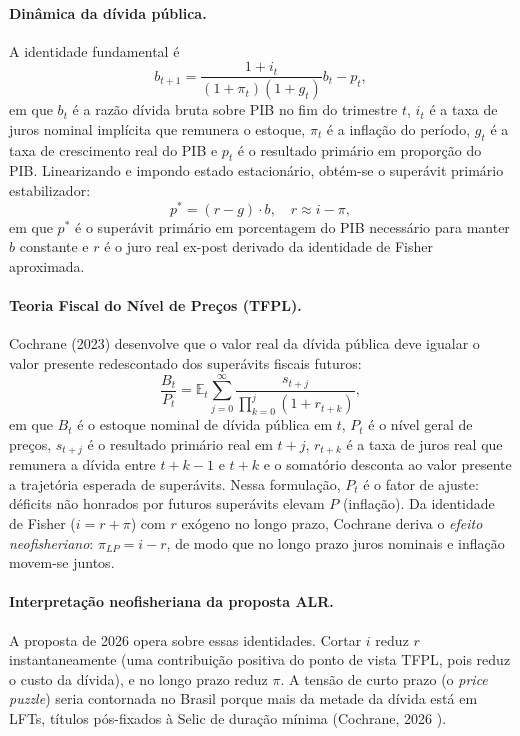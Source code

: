 \documentclass[11pt,a4paper]{article}
\begin{document}
\paragraph{Dinâmica da dívida pública.} A identidade fundamental é
\begin{equation}\label{eq:divida}
b_{t+1} = \frac{1 + i_t}{(1 + \pi_t)(1 + g_t)} b_t - p_t,
\end{equation}
em que $b_t$ é a razão dívida bruta sobre PIB no fim do trimestre $t$,
$i_t$ é a taxa de juros nominal implícita que remunera o estoque,
$\pi_t$ é a inflação do período, $g_t$ é a taxa de crescimento real do
PIB e $p_t$ é o resultado primário em proporção do PIB. Linearizando e
impondo estado estacionário, obtém-se o superávit primário
estabilizador:
\begin{equation}\label{eq:pestab}
p^* = (r - g) \cdot b, \quad r \approx i - \pi,
\end{equation}
em que $p^*$ é o superávit primário em porcentagem do PIB necessário
para manter $b$ constante e $r$ é o juro real ex-post derivado da
identidade de Fisher aproximada.

\paragraph{Teoria Fiscal do Nível de Preços (TFPL).} Cochrane (2023)
\cite{cochrane2023} desenvolve que o valor real da dívida pública deve
igualar o valor presente redescontado dos superávits fiscais futuros:
\begin{equation}\label{eq:tfpl}
\frac{B_t}{P_t} = \mathbb{E}_t \sum_{j=0}^{\infty} \frac{s_{t+j}}{\prod_{k=0}^{j} (1+r_{t+k})},
\end{equation}
em que $B_t$ é o estoque nominal de dívida pública em $t$, $P_t$ é o
nível geral de preços, $s_{t+j}$ é o resultado primário real em $t+j$,
$r_{t+k}$ é a taxa de juros real que remunera a dívida entre $t+k-1$ e
$t+k$ e o somatório desconta ao valor presente a trajetória esperada de
superávits. Nessa formulação, $P_t$ é o fator de ajuste: déficits não
honrados por futuros superávits elevam $P$ (inflação). Da identidade de
Fisher ($i = r + \pi$) com $r$ exógeno no longo prazo, Cochrane deriva o
\emph{efeito neofisheriano}: $\pi_{LP} = i - r$, de modo que no longo
prazo juros nominais e inflação movem-se juntos.

\paragraph{Interpretação neofisheriana da proposta ALR.} A proposta de
2026 opera sobre essas identidades. Cortar $i$ reduz $r$ instantaneamente
(uma contribuição positiva do ponto de vista TFPL, pois reduz o custo da
dívida), e no longo prazo reduz $\pi$. A tensão de curto prazo (o
\emph{price puzzle}) seria contornada no Brasil porque mais da metade da
dívida está em LFTs, títulos pós-fixados à Selic de duração mínima
(Cochrane, 2026 \cite{cochrane2026}).
\end{document}
